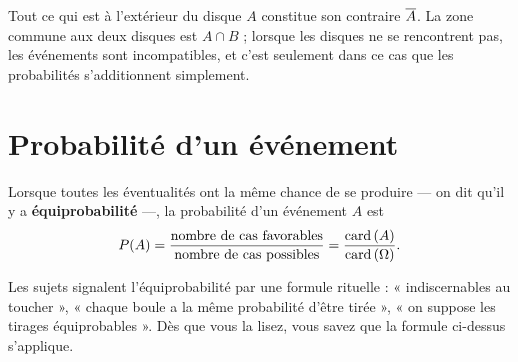 \begin{visualisation}
\begin{center}
\end{center}

Tout ce qui est à l'extérieur du disque $A$ constitue son contraire
$\overline{A}$. La zone commune aux deux disques est $A \cap B$ ; lorsque les
disques ne se rencontrent pas, les événements sont incompatibles, et c'est
seulement dans ce cas que les probabilités s'additionnent simplement.
\end{visualisation}

\section{Probabilité d'un événement}

\begin{definition}
Lorsque toutes les éventualités ont la même chance de se produire — on dit
qu'il y a \textbf{équiprobabilité} —, la probabilité d'un événement $A$ est
\[
  P\!\left(A\right) = \frac{\text{nombre de cas favorables}}
                   {\text{nombre de cas possibles}}
            = \frac{\operatorname{card}\left(A\right)}{\operatorname{card}\left(\Omega\right)} .
\]
\end{definition}

\begin{remarque}
Les sujets signalent l'équiprobabilité par une formule rituelle :
« indiscernables au toucher », « chaque boule a la même probabilité d'être
tirée », « on suppose les tirages équiprobables ». Dès que vous la lisez,
vous savez que la formule ci-dessus s'applique.
\end{remarque}

